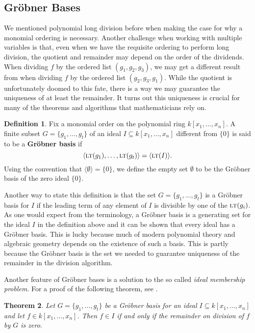 \documentclass[MS, xcolor=dvipsnames]{wfuthesis}
\def\sbs{\subseteq}
\newcommand{\LT}{\ensuremath{\text{\sc lt}}}
\newtheorem{theorem}{Theorem}
\theoremstyle{definition}
\newtheorem{definition}[theorem]{Definition}
\begin{document}
\subsection{Gr\"obner Bases}
We mentioned polynomial long division before when making the case for why a monomial ordering is necessary. Another challenge when working with multiple variables is that, even when we have the requisite ordering to perform long division, the quotient and remainder may depend on the order of the dividends. When dividing $f$ by the ordered list $(g_1,g_2,g_3)$, we may get a different result from when dividing $f$ by the ordered list $(g_2,g_3,g_1)$. While the quotient is unfortunately doomed to this fate, there is a way we may guarantee the uniqueness of at least the remainder. It turns out this uniqueness is crucial for many of the theorems and algorithms that mathematicians rely on. \par
\begin{definition}
  Fix a monomial order on the polynomial ring $k[x_1,\dots,x_n]$. A finite subset $G = \{ g_1,\dots,g_t \}$ of an ideal $I \sbs k[x_1,\dots,x_n]$ different from $\{0\}$ is said to be a \textbf{Gr\"obner basis} if
  \[ \langle \LT(g_1), \dots, \LT(g_t) \rangle = \langle \LT(I) \rangle. \]
  Using the convention that $\langle \emptyset \rangle = \{0\}$, we define the empty set $\emptyset$ to be the Gr\"obner basis of the zero ideal $\{0\}$.
\end{definition}
Another way to state this definition is that the set $G = \{ g_1,\dots,g_t \}$ is a Gr\"obner basis for $I$ if the leading term of any element of $I$ is divisible by one of the $\LT(g_i)$. As one would expect from the terminology, a Gr\"obner basis is a generating set for the ideal $I$ in the definition above and it can be shown that every ideal has a Gr\"obner basis. This is lucky because much of modern polynomial theory and algebraic geometry depends on the existence of such a basis. This is partly because the Gr\"obner basis is the set we needed to guarantee uniqueness of the remainder in the division algorithm. \par
Another feature of Gr\"obner bases is a solution to the so called \emph{ideal membership problem}. For a proof of the following theorem, see \cite{Cox2015}.
\begin{theorem}
  Let $G = \{ g_1,\dots,g_t \}$ be a Gr\"obner basis for an ideal $I \sbs k[x_1,\dots,x_n]$ and let $f \in k[x_1,\dots,x_n]$. Then $f \in I$ if and only if the remainder on division of $f$ by $G$ is zero.
\end{theorem}
\end{document}
